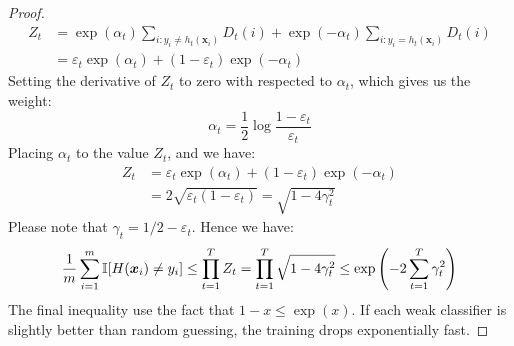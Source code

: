 \begin{proof}
\begin{equation*}
\begin{aligned}
        Z_t &= \exp(\alpha_t)\sum_{i : y_i \ne h_t(\boldsymbol x_i)}D_t(i) + \exp(-\alpha_t)\sum_{i: y_i = h_t(\boldsymbol x_i)}D_t(i) \\
        &= \varepsilon_t\exp(\alpha_t) + (1-\varepsilon_t)\exp(-\alpha_t)
    \end{aligned}
    \end{equation*}
    Setting the derivative of $Z_t$ to zero with respected to $\alpha_t$, which gives us the weight:
    \begin{equation*}
        \alpha_t = \frac{1}{2}\log\frac{1-\varepsilon_t}{\varepsilon_t}
    \end{equation*}
    Placing $\alpha_t$ to the value $Z_t$, and we have:
    \begin{equation*}
    \begin{aligned}
        Z_t &= \varepsilon_t\exp(\alpha_t) + (1-\varepsilon_t)\exp(-\alpha_t) \\
        &= 2\sqrt{\varepsilon_t(1-\varepsilon_t)} = \sqrt{1-4\gamma^2_t}
    \end{aligned}
    \end{equation*}
    Please note that $\gamma_t = 1/2-\varepsilon_t$. Hence we have:
    \begin{equation*}
        \frac{1}{m}\sum^m_{i=1}\mathbb{I}[H(\boldsymbol x_i) \ne y_i] \le \prod^T_{t=1}Z_t = \prod^T_{t=1}\sqrt{1-4\gamma^2_t} \le \exp\left( -2\sum^T_{t=1}\gamma_t^2 \right)
    \end{equation*}
    The final inequality use the fact that $1-x\le\exp(x)$. If each weak classifier is slightly better than random guessing, the training drops exponentially fast. 
\end{proof}

